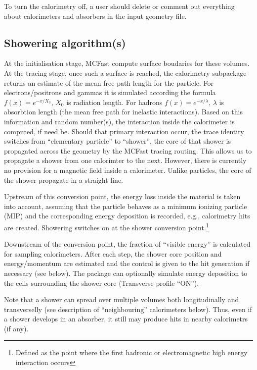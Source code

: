 To turn the calorimetry off, a user should delete or comment out everything 
about calorimeters and absorbers in the input geometry file.

\subsection{Showering algorithm(s)}

At the initialisation stage, MCFast compute surface boudaries for these
volumes. At the tracing stage, once such a surface is reached, the calorimetry
subpackage returns an estimate of the mean free path length for the particle.
For electrons/positrons and  gammas it is simulated according the formula $f(x)
= e^{-x/X_0}$, $X_0$ is  radiation length. For hadrons $f(x)=e^{-x/\lambda}$,
$\lambda$ is absorbtion  length (the mean free path for inelastic
interactions).  Based on this information and random number(s), the interaction
inside the  calorimeter is computed,  if need be.  Should that primary
interaction occur,  the trace identity switches from ``elementary particle'' to
``shower'', the core of that shower is propagated across the geometry by the
MCFast tracing routing.  This allows us to propagate a shower from one
calorimter to the next.  However, there is currently no provision for a magnetic
field inside a calorimeter. Unlike particles, the core
of the shower propagate in a straight line.

\par Upstream of this conversion point, the energy loss inside the  material is
taken into account, assuming that the particle behaves as a minimum ionizing
particle (MIP) and the corresponding energy deposition is recorded, e.g., 
calorimetry hits are created. Showering switches on at the shower conversion
point.\footnote{Defined as the point where the first hadronic or electromagnetic
high energy interaction occurs}  

Downstream of the conversion point, the fraction of ``visible energy''
is calculated for sampling calorimeters. After each step, the shower core
position and energy/momentum are estimated and the control is given to the hit 
generation if necessary (see below). The package can optionally simulate 
energy deposition to the cells surrounding the shower core 
(Transverse profile ``ON'').  

Note that a shower can spread over multiple volumes both longitudinally
and transverselly (see description of ``neighbouring'' calorimeters below).
Thus, even if a shower develops in an absorber, it still may produce hits
in nearby calorimetrs (if any). 

